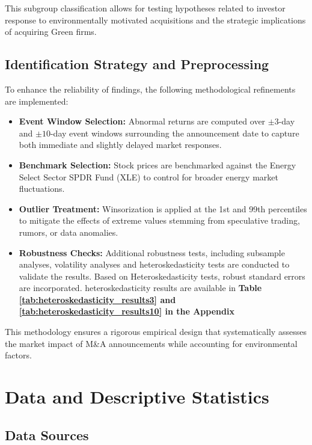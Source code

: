 \documentclass[a4paper]{article}
\begin{document}
This subgroup classification allows for testing hypotheses related to investor response to environmentally motivated acquisitions and the strategic implications of acquiring Green firms.

\subsection{Identification Strategy and Preprocessing}

To enhance the reliability of findings, the following methodological refinements are implemented:
\begin{itemize}
    \setlength{\itemsep}{0pt}
    \item \textbf{Event Window Selection:} Abnormal returns are computed over \(\pm3\)-day and \(\pm10\)-day event windows surrounding the announcement date to capture both immediate and slightly delayed market responses.
    \item \textbf{Benchmark Selection:} Stock prices are benchmarked against the Energy Select Sector SPDR Fund (XLE) to control for broader energy market fluctuations.
    \item \textbf{Outlier Treatment:} Winsorization is applied at the 1st and 99th percentiles to mitigate the effects of extreme values stemming from speculative trading, rumors, or data anomalies.
    \item \textbf{Robustness Checks:} Additional robustness tests, including subsample analyses, volatility analyses and heteroskedasticity tests are conducted to validate the results. Based on Heteroskedasticity tests, robust standard errors are incorporated. heteroskedasticity results are available in \textbf{Table \ref{tab:heteroskedasticity_results3} and \ref{tab:heteroskedasticity_results10} in the Appendix} 
\end{itemize}

This methodology ensures a rigorous empirical design that systematically assesses the market impact of M\&A announcements while accounting for environmental factors.

\section{Data and Descriptive Statistics}

\subsection{Data Sources}
\end{document}
